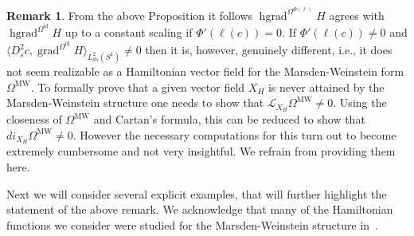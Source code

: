\documentclass[12pt]{amsart}
\newcommand{\rev}[1]{#1}
\theoremstyle{definition}
\newtheorem{remark}[theorem]{Remark}
\newcommand{\OmMW}{\Omega^{\operatorname{MW}}}
\def\Om{\Omega}
\let\on=\operatorname
\begin{document}
\begin{remark}
From the above Proposition it follows \(\on{hgrad}^{\Om^{\Phi(\ell)}}H\) agrees with \(\on{hgrad}^{\Om^{\on{id}}}H\) up to a constant scaling if $\Phi'(\rev{\ell(c)})=0$.
If  \(\Phi'(\rev{\ell(c)})\neq 0\) and \(\langle D_s^2 c, \on{grad}^{\Om^{\on{id}}}H\rangle_{L^2_{ds}(S^1)}\neq 0\) then it is, however, genuinely different, i.e., it does not seem realizable as a Hamiltonian vector field for the Marsden-Weinstein form \(\OmMW\). To formally prove that a given vector field $X_H$ is never attained by the Marsden-Weinstein structure one needs to show that $\mathcal{L}_{X_H}\OmMW \neq 0$. Using the closeness of $\OmMW$ and Cartan's formula, this can be reduced to show that $di_{X_H}\OmMW\neq 0$. However the necessary computations for this turn out to become extremely cumbersome and not very insightful. We refrain from providing them here. 
\end{remark}
Next we will consider several explicit examples, that will further highlight the statement of the above remark. We acknowledge that many of the Hamiltonian functions we consider were studied for the Marsden-Weinstein structure in~\cite{chern_knöppel_pedit_pinkall_2020}.
\end{document}
